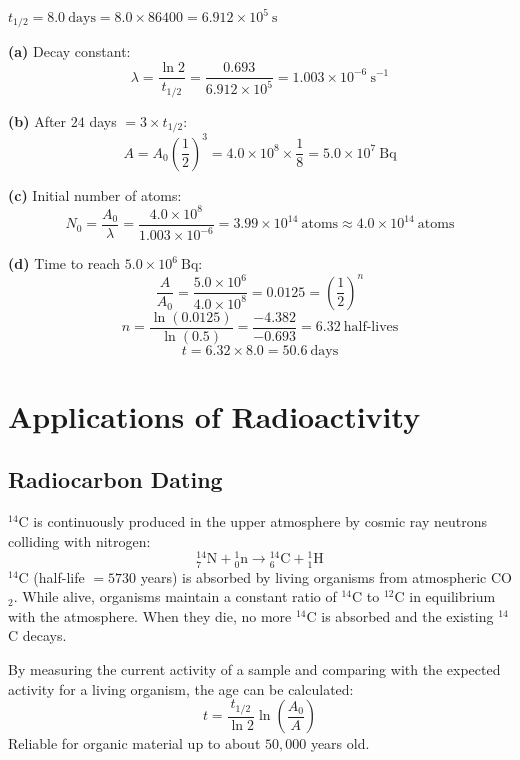 \begin{solutionbox}
$t_{1/2} = 8.0\ \text{days} = 8.0 \times 86400
= 6.912\times10^5\ \text{s}$

\textbf{(a)} Decay constant:
\[
  \lambda = \frac{\ln 2}{t_{1/2}}
  = \frac{0.693}{6.912\times10^5}
  = 1.003\times10^{-6}\ \text{s}^{-1}
\]

\textbf{(b)} After $24$ days $= 3 \times t_{1/2}$:
\[
  A = A_0\left(\frac{1}{2}\right)^3
  = 4.0\times10^8 \times \frac{1}{8}
  = 5.0\times10^7\ \text{Bq}
\]

\textbf{(c)} Initial number of atoms:
\[
  N_0 = \frac{A_0}{\lambda}
  = \frac{4.0\times10^8}{1.003\times10^{-6}}
  = 3.99\times10^{14}\ \text{atoms}
  \approx 4.0\times10^{14}\ \text{atoms}
\]

\textbf{(d)} Time to reach $5.0\times10^6\ \text{Bq}$:
\[
  \frac{A}{A_0} = \frac{5.0\times10^6}{4.0\times10^8}
  = 0.0125 = \left(\frac{1}{2}\right)^n
\]
\[
  n = \frac{\ln(0.0125)}{\ln(0.5)}
  = \frac{-4.382}{-0.693} = 6.32\ \text{half-lives}
\]
\[
  t = 6.32 \times 8.0 = 50.6\ \text{days}
\]
\end{solutionbox}

\section{Applications of Radioactivity}

\subsection{Radiocarbon Dating}

\begin{processbox}
${}^{14}$C is continuously produced in the upper
atmosphere by cosmic ray neutrons colliding with
nitrogen:
\[
  {}^{14}_{7}\text{N} + {}^{1}_{0}\text{n}
  \rightarrow {}^{14}_{6}\text{C}
  + {}^{1}_{1}\text{H}
\]
${}^{14}$C (half-life $= 5730$ years) is absorbed
by living organisms from atmospheric CO$_2$. While
alive, organisms maintain a constant ratio of
${}^{14}$C to ${}^{12}$C in equilibrium with the
atmosphere. When they die, no more ${}^{14}$C is
absorbed and the existing ${}^{14}$C decays.

By measuring the current activity of a sample and
comparing with the expected activity for a living
organism, the age can be calculated:
\[
  t = \frac{t_{1/2}}{\ln 2}\ln\left(\frac{A_0}{A}\right)
\]
Reliable for organic material up to about $50{,}000$
years old.
\end{processbox}

